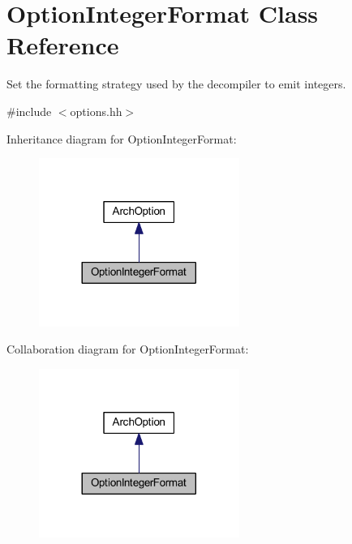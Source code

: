 \hypertarget{class_option_integer_format}{}\section{Option\+Integer\+Format Class Reference}
\label{class_option_integer_format}


Set the formatting strategy used by the decompiler to emit integers.  




{\ttfamily \#include $<$options.\+hh$>$}



Inheritance diagram for Option\+Integer\+Format\+:
\nopagebreak
\begin{figure}[H]
\begin{center}
\leavevmode
\includegraphics[width=185pt]{class_option_integer_format__inherit__graph}
\end{center}
\end{figure}


Collaboration diagram for Option\+Integer\+Format\+:
\nopagebreak
\begin{figure}[H]
\begin{center}
\leavevmode
\includegraphics[width=185pt]{class_option_integer_format__coll__graph}
\end{center}
\end{figure}
